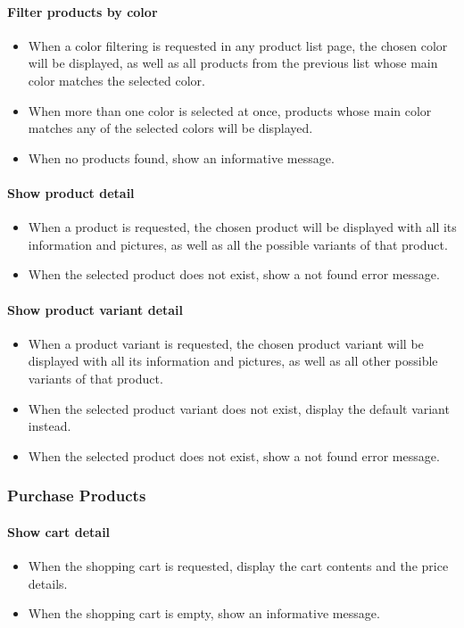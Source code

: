 \begin{appendices}
\paragraph{Filter products by color}
\begin{itemize}
	\item When a color filtering is requested in any product list page, the chosen color will be displayed, as well as all products from the previous list whose main color matches the selected color.
	\item When more than one color is selected at once, products whose main color matches any of the selected colors will be displayed.
	\item When no products found, show an informative message.
\end{itemize}

\paragraph{Show product detail}
\begin{itemize}
	\item When a product is requested, the chosen product will be displayed with all its information and pictures, as well as all the possible variants of that product.
	\item When the selected product does not exist, show a not found error message.
\end{itemize}

\paragraph{Show product variant detail}
\begin{itemize}
	\item When a product variant is requested, the chosen product variant will be displayed with all its information and pictures, as well as all other possible variants of that product.
	\item When the selected product variant does not exist, display the default variant instead.
	\item When the selected product does not exist, show a not found error message.
\end{itemize}
  
\subsubsection{Purchase Products}
\paragraph{Show cart detail}
\begin{itemize}
	\item When the shopping cart is requested, display the cart contents and the price details.
	\item When the shopping cart is empty, show an informative message.
\end{itemize}


\end{appendices}
